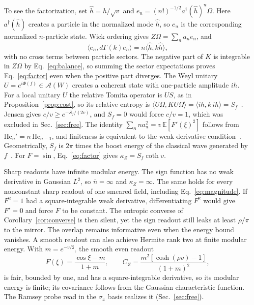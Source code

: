 \documentclass[11pt,a4paper]{article}
\newcommand{\A}{\mathcal A}
\newcommand{\E}{\mathbb E}
\begin{document}
To see the factorization, set $\hat h=h/\sqrt v$ and $e_n=(n!)^{-1/2}a^\dagger(\hat h)^n\Omega$. Here $a^\dagger(\hat h)$ creates a particle in the normalized mode $\hat h$, so $e_n$ is the corresponding normalized $n$-particle state. Wick ordering gives $Z\Omega=\sum_n a_n e_n$, and
\begin{equation*}
 \langle e_n,d\Gamma(k)e_n\rangle
 =n\langle\hat h,k\hat h\rangle ,
\end{equation*}
with no cross terms between particle sectors. The negative part of $K$ is integrable in $Z\Omega$ by Eq.~\eqref{eq:balance}, so summing the sector expectations proves Eq.~\eqref{eq:factor} even when the positive part diverges. The Weyl unitary $U=e^{i\Phi(f)}\in\A(W)$ creates a coherent state with one-particle amplitude $ih$. For a local unitary $U$ the relative Tomita operator is $US$, as in Proposition~\ref{prop:cost}, so its relative entropy is $\langle U\Omega,KU\Omega\rangle=\langle ih,k\,ih\rangle=S_f$~\cite{longo2019entropy,casini2019relative}. Jensen gives $c/v\ge e^{-S_f/(2v)}$, and $S_f=0$ would force $c/v=1$, which was excluded in Sec.~\ref{sec:free}. The identity $\sum_n na_n^2=v\,\E[F'(\xi)^2]$ follows from $\mathrm{He}_n'=n\,\mathrm{He}_{n-1}$, and finiteness is equivalent to the weak-derivative condition~\cite{nualart2006malliavin}. Geometrically, $S_f$ is $2\pi$ times the boost energy of the classical wave generated by $f$~\cite{longo2019entropy,ciolli2020information}. For $F=\sin$, Eq.~\eqref{eq:factor} gives $\kappa_Z=S_f\coth v$.

Sharp readouts have infinite modular energy. The sign function has no weak derivative in Gaussian $L^2$, so $\bar n=\infty$ and $\kappa_Z=\infty$. The same holds for every nonconstant sharp readout of one smeared field, including Eq.~\eqref{eq:magnitude}. If $F^2=1$ had a square-integrable weak derivative, differentiating $F^2$ would give $F'=0$ and force $F$ to be constant. The entropic converse of Corollary~\ref{cor:converse} is then silent, yet the sign readout still leaks at least $\rho/\pi$ to the mirror. The overlap remains informative even when the energy bound vanishes. A smooth readout can also achieve Hermite rank two at finite modular energy. With $m=e^{-v/2}$, the smooth even readout
\begin{equation}
 F(\xi)=\frac{\cos\xi-m}{1+m},\qquad
 C_Z=\frac{m^2[\cosh(\rho v)-1]}{(1+m)^2},
 \label{eq:even-smooth}
\end{equation}
is fair, bounded by one, and has a square-integrable derivative, so its modular energy is finite; its covariance follows from the Gaussian characteristic function. The Ramsey probe read in the $\sigma_x$ basis realizes it (Sec.~\ref{sec:free}).
\end{document}
